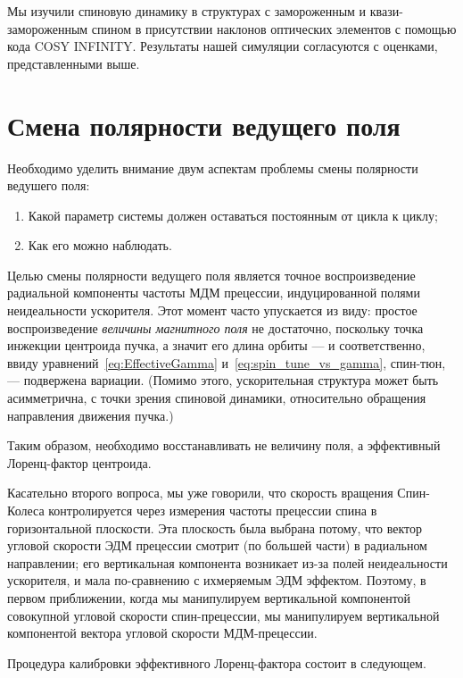 Мы изучили спиновую динамику в структурах с замороженным и
квази-замороженным спином в присутствии наклонов оптических элементов
с помощью кода COSY INFINITY. Результаты нашей симуляции согласуются с оценками,
представленными выше.



\section{Смена полярности ведущего поля}\label{chpt3:GFF}

Необходимо уделить внимание двум аспектам проблемы смены полярности ведушего поля:
\begin{enumerate}
	\item Какой параметр системы должен оставаться постоянным от цикла к циклу;
	\item Как его можно наблюдать.
\end{enumerate}

Целью смены полярности ведущего поля является точное воспроизведение радиальной компоненты
частоты МДМ прецессии, индуцированной полями неидеальности ускорителя. Этот момент часто упускается из виду:
простое воспроизведение \emph{величины магнитного поля} не достаточно, поскольку точка инжекции центроида пучка,
а значит его длина орбиты --- и соответственно, ввиду уравнений~\eqref{eq:EffectiveGamma}
 и~\eqref{eq:spin_tune_vs_gamma}, спин-тюн, --- подвержена вариации. (Помимо этого, ускорительная структура
  может быть асимметрична,	с точки зрения спиновой динамики, относительно обращения 
  направления движения пучка.)

Таким образом, необходимо восстанавливать не величину поля, а эффективный Лоренц-фактор центроида.

Касательно второго вопроса, мы уже говорили, что скорость вращения Спин-Колеса
контролируется через измерения частоты прецессии спина в горизонтальной плоскости. 
Эта плоскость была выбрана потому, что вектор угловой скорости ЭДМ прецессии смотрит
(по большей части) в радиальном направлении; его вертикальная компонента возникает из-за полей
неидеальности ускорителя, и мала по-сравнению с ихмеряемым ЭДМ эффектом.
Поэтому, в первом приближении, когда мы манипулируем вертикальной компонентой совокупной угловой скорости спин-прецессии, мы манипулируем вертикальной компонентой вектора угловой скорости МДМ-прецессии.

Процедура калибровки эффективного Лоренц-фактора состоит в следующем.



\clearpage
